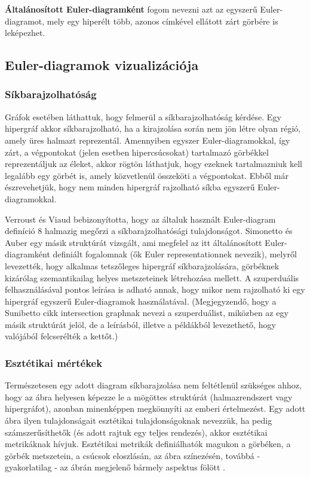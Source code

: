 \begin{definition}
\textbf{Általánosított Euler-diagramként} fogom nevezni azt az egyszerű Euler-diagramot, mely egy hiperélt több, azonos címkével ellátott zárt görbére is leképezhet.
\end{definition}


\subsection{Euler-diagramok vizualizációja}

\subsubsection{Síkbarajzolhatóság}
Gráfok esetében láthattuk, hogy felmerül a síkbarajzolhatóság kérdése. Egy hipergráf akkor síkbarajzolható, ha a kirajzolása során nem jön létre olyan régió, amely üres halmazt reprezentál. Amennyiben egyszer Euler-diagramokkal, így zárt, a végpontokat (jelen esetben hipercsúcsokat) tartalmazó görbékkel reprezentáljuk az éleket, akkor rögtön láthatjuk, hogy ezeknek tartalmazniuk kell legalább egy görbét is, amely közvetlenül összeköti a végpontokat. Ebből már észrevehetjük, hogy nem minden hipergráf rajzolható síkba egyszerű Euler-diagramokkal.


Verroust és Viaud bebizonyította\cite{drawability_8_sets}, hogy az általuk használt Euler-diagram definíció 8 halmazig megőrzi a síkbarajzolhatósági tulajdonságot. Simonetto és Auber egy másik struktúrát vizsgált\cite{simonetto_undrawable}, ami megfelel az itt általánosított Euler-diagramként definiált fogalomnak (ők Euler representationnek nevezik), melyről levezették, hogy alkalmas tetszőleges hipergráf síkbarajzolására, görbéknek kizárólag szemantikailag helyes metszeteinek létrehozása mellett. A szuperduális felhasználásával pontos leírása is adható annak, hogy mikor nem rajzolható ki egy hipergráf egyszerű Euler-diagramok használatával\cite{simonetto_undrawable, drawability_8_sets}. (Megjegyzendő, hogy a Sunibetto cikk intersection graphnak nevezi a szuperduálist, miközben az egy másik struktúrát jelöl, de a leírásból, illetve a példákból levezethető, hogy valójából felcserélték a kettőt.)

\subsubsection{Esztétikai mértékek} \label{eulerAesthetic}

Természetesen egy adott diagram síkbarajzolása nem feltétlenül szükséges ahhoz, hogy az ábra helyesen képezze le a mögöttes struktúrát (halmazrendszert vagy hipergráfot), azonban minenképpen megkönnyíti az emberi értelmezést. Egy adott ábra ilyen tulajdonságait esztétikai tulajdonságoknak nevezzük, ha pedig számszerűsíthetők (és adott rajtuk egy teljes rendezés), akkor esztétikai metrikáknak hívjuk. Esztétikai metrikák definiálhatók magukon a görbéken, a görbék metszetein, a csúcsok eloszlásán, az ábra színezésén, továbbá - gyakorlatilag - az ábrán megjelenő bármely aspektus fölött \cite{euler_force, which_well_formed, layout_metrics}.


